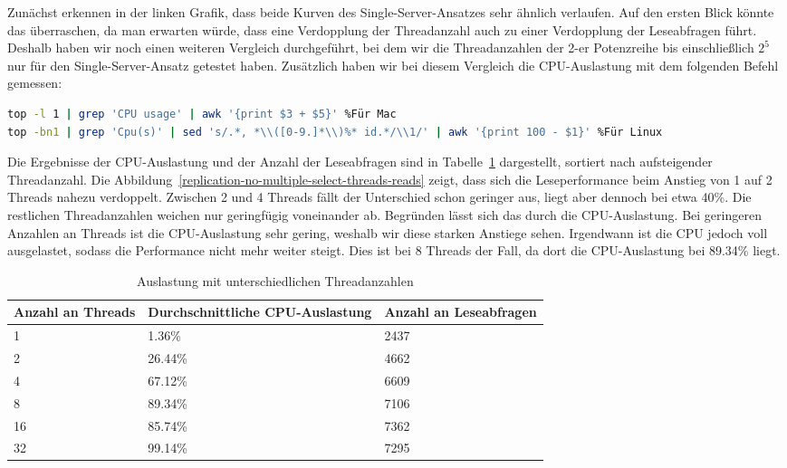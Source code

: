 Zunächst erkennen in der linken Grafik, dass beide Kurven des Single-Server-Ansatzes sehr ähnlich verlaufen.
Auf den ersten Blick könnte das überraschen, da man erwarten würde, dass eine Verdopplung der Threadanzahl auch zu einer Verdopplung der Leseabfragen führt.
Deshalb haben wir noch einen weiteren Vergleich durchgeführt, bei dem wir die Threadanzahlen der 2-er Potenzreihe bis einschließlich $2^5$ nur für den Single-Server-Ansatz getestet haben.
Zusätzlich haben wir bei diesem Vergleich die CPU-Auslastung mit dem folgenden Befehl gemessen:

\vspace{-5pt}
\begin{lstlisting}[language=bash,caption=Messen der CPU-Auslastung,label={lst:replication-cpu-usage},style=custom_daniel,basicstyle=\ttfamily\scriptsize]
top -l 1 | grep 'CPU usage' | awk '{print $3 + $5}' %Für Mac
top -bn1 | grep 'Cpu(s)' | sed 's/.*, *\\([0-9.]*\\)%* id.*/\\1/' | awk '{print 100 - $1}' %Für Linux
\end{lstlisting}
\vspace{-5pt}

Die Ergebnisse der CPU-Auslastung und der Anzahl der Leseabfragen sind in Tabelle~\ref{tab:replication-multiple-select-threads} dargestellt, sortiert nach aufsteigender Threadanzahl.
Die Abbildung~\ref{replication-no-multiple-select-threads-reads} zeigt, dass sich die Leseperformance beim Anstieg von 1 auf 2 Threads nahezu verdoppelt.
Zwischen 2 und 4 Threads fällt der Unterschied schon geringer aus, liegt aber dennoch bei etwa 40\%.
Die restlichen Threadanzahlen weichen nur geringfügig voneinander ab.
Begründen lässt sich das durch die CPU-Auslastung.
Bei geringeren Anzahlen an Threads ist die CPU-Auslastung sehr gering, weshalb wir diese starken Anstiege sehen.
Irgendwann ist die CPU jedoch voll ausgelastet, sodass die Performance nicht mehr weiter steigt.
Dies ist bei 8 Threads der Fall, da dort die CPU-Auslastung bei 89.34\% liegt.

\vspace{-5pt}
\begin{table}[H]
  \centering
  \scriptsize
  \begin{tabular}{|l|l|l|}
    \hline
    \textbf{Anzahl an Threads} & \textbf{Durchschnittliche CPU-Auslastung} & \textbf{Anzahl an Leseabfragen} \\
    \hline
    1 & 1.36\% & 2437 \\
    2 & 26.44\% & 4662 \\
    4 & 67.12\% & 6609 \\
    8 & 89.34\% & 7106 \\
    16 & 85.74\% & 7362 \\
    32 & 99.14\% & 7295 \\
    \hline
  \end{tabular}
  \vspace{3pt}
  \caption{Auslastung mit unterschiedlichen Threadanzahlen}
  \label{tab:replication-multiple-select-threads}
\end{table}
\vspace{-25pt}

